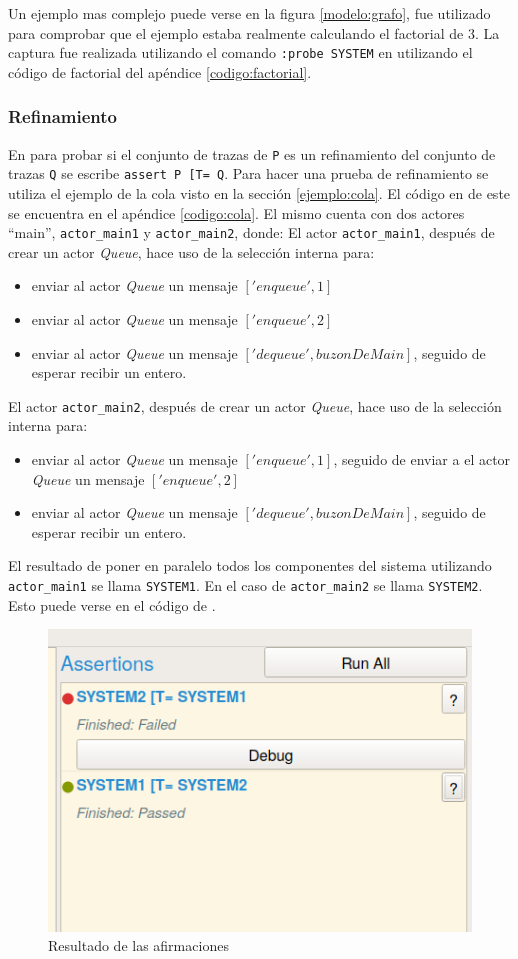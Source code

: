 Un ejemplo mas complejo puede verse en la figura \ref{modelo:grafo}, fue utilizado para comprobar que el ejemplo estaba realmente calculando el factorial de 3. La captura fue realizada utilizando el comando \verb=:probe SYSTEM= en \FDR utilizando el código de factorial del apéndice \ref{codigo:factorial}.

\subsubsection*{Refinamiento}

En \FDR para probar si el conjunto de trazas de \verb=P= es un refinamiento del conjunto de trazas \verb=Q= se escribe \verb$assert P [T= Q$. Para hacer una prueba de refinamiento se utiliza el ejemplo de la cola visto en la sección \ref{ejemplo:cola}. El código en \CSPm de este se encuentra en el apéndice \ref{codigo:cola}. El mismo cuenta con dos actores ``main'', \verb=actor_main1= y \verb=actor_main2=, donde:
El actor \verb=actor_main1=, después de crear un actor \textit{Queue}, hace uso de la selección interna para:
\begin{itemize}
 \item enviar al actor \textit{Queue} un mensaje $['enqueue', 1]$
 \item enviar al actor \textit{Queue} un mensaje $['enqueue', 2]$
 \item enviar al actor \textit{Queue} un mensaje $['dequeue', buzonDeMain]$, seguido de esperar recibir un entero.
\end{itemize}

El actor \verb=actor_main2=, después de crear un actor \textit{Queue}, hace uso de la selección interna para:
\begin{itemize}
 \item enviar al actor \textit{Queue} un mensaje $['enqueue', 1]$, seguido de enviar a el actor \textit{Queue} un mensaje $['enqueue', 2]$
 \item enviar al actor \textit{Queue} un mensaje $['dequeue', buzonDeMain]$, seguido de esperar recibir un entero.
\end{itemize}

El resultado de poner en paralelo todos los componentes del sistema utilizando \verb=actor_main1= se llama \verb=SYSTEM1=. En el caso de \verb=actor_main2= se llama \verb=SYSTEM2=. Esto puede verse en el código de \CSPm.

\begin{figure}
\begin{center}
\includegraphics[width=5 cm]{img/trazas.png}
\caption{Resultado de las afirmaciones}\label{modelo:verifica}
\end{center}
\end{figure}

